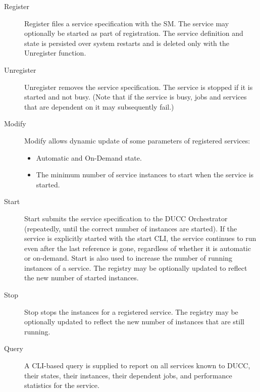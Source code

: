     \begin{description}
        \item[Register] Register files a service specification with the SM. The service may optionally
          be started as part of registration. The service definition and state is persisted over system
          restarts and is deleted only with the Unregister function.
          
        \item[Unregister] Unregister removes the service specification. The service is stopped if it is
          started and not busy. (Note that if the service is busy, jobs and services that are dependent
          on it may subsequently fail.)
          
        \item[Modify] Modify allows dynamic update of some parameters of registered services:
            \begin{itemize}
              \item Automatic and On-Demand state.
              \item The minimum number of service instances to start when the service is started.  
            \end{itemize}

        \item[Start] Start submits the service specification to the DUCC Orchestrator (repeatedly,
          until the correct number of instances are started). If the service is explicitly started
          with the start CLI, the service continues to run even after the last reference is gone,
          regardless of whether it is automatic or on-demand. Start is also used to increase the
          number of running instances of a service. The registry may be optionally updated to
          reflect the new number of started instances.
          
        \item[Stop] Stop stops the instances for a registered service. The registry may be
          optionally updated to reflect the new number of instances that are still running.

        \item[Query] A CLI-based query is supplied to report on all services known to DUCC, their
          states, their instances, their dependent jobs, and performance statistics for the service.
    \end{description}
        
